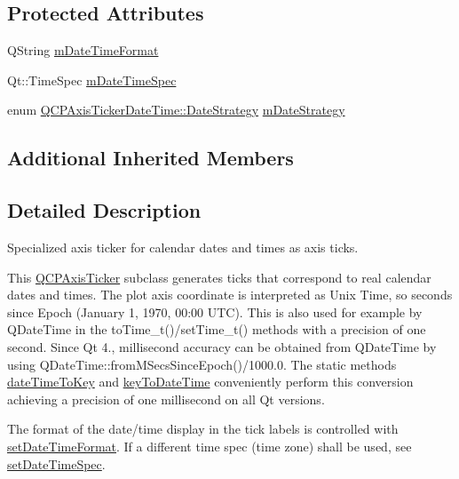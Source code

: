 \subsection*{Protected Attributes}
\begin{DoxyCompactItemize}
\item 
Q\+String \hyperlink{class_q_c_p_axis_ticker_date_time_adbbb25add598377998c0c57dbd29adaf}{m\+Date\+Time\+Format}
\item 
Qt\+::\+Time\+Spec \hyperlink{class_q_c_p_axis_ticker_date_time_a5f5abe83c371f13eb3415585e638dba9}{m\+Date\+Time\+Spec}
\item 
enum \hyperlink{class_q_c_p_axis_ticker_date_time_af2c7c60821a6234ca7a172f42ef7f1d8}{Q\+C\+P\+Axis\+Ticker\+Date\+Time\+::\+Date\+Strategy} \hyperlink{class_q_c_p_axis_ticker_date_time_a93fca912446ca341bee277cb2cc84e49}{m\+Date\+Strategy}
\end{DoxyCompactItemize}
\subsection*{Additional Inherited Members}


\subsection{Detailed Description}
Specialized axis ticker for calendar dates and times as axis ticks. 



This \hyperlink{class_q_c_p_axis_ticker}{Q\+C\+P\+Axis\+Ticker} subclass generates ticks that correspond to real calendar dates and times. The plot axis coordinate is interpreted as Unix Time, so seconds since Epoch (January 1, 1970, 00\+:00 U\+TC). This is also used for example by Q\+Date\+Time in the {\ttfamily to\+Time\+\_\+t()/set\+Time\+\_\+t()} methods with a precision of one second. Since Qt 4., millisecond accuracy can be obtained from Q\+Date\+Time by using {\ttfamily Q\+Date\+Time\+::from\+M\+Secs\+Since\+Epoch()/1000.0}. The static methods \hyperlink{class_q_c_p_axis_ticker_date_time_aa24f293f16fff0f937bf71f4140033f1}{date\+Time\+To\+Key} and \hyperlink{class_q_c_p_axis_ticker_date_time_a4c1761ad057f5564804a53f942629b53}{key\+To\+Date\+Time} conveniently perform this conversion achieving a precision of one millisecond on all Qt versions.

The format of the date/time display in the tick labels is controlled with \hyperlink{class_q_c_p_axis_ticker_date_time_ad52660a82f688395468674d555f6a86b}{set\+Date\+Time\+Format}. If a different time spec (time zone) shall be used, see \hyperlink{class_q_c_p_axis_ticker_date_time_afbd987c7197e42ab61e67fb1c38abebc}{set\+Date\+Time\+Spec}.

